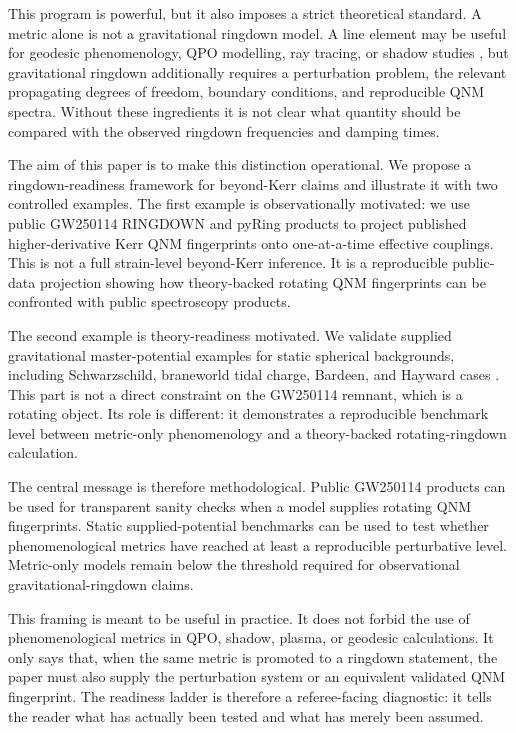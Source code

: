 \documentclass[aps,prd,10pt,twocolumn,nofootinbib,superscriptaddress]{revtex4-2}
\begin{document}
This program is powerful, but it also imposes a strict theoretical standard.
A metric alone is not a gravitational ringdown model. A line element may be
useful for geodesic phenomenology, QPO modelling, ray tracing, or shadow
studies \cite{Joh:2013:PRD:,Kon-Rez-Zhi:2016:PRD:,Ped-Vag:2024:PRD:},
but gravitational ringdown additionally requires a perturbation problem, the
relevant propagating degrees of freedom, boundary conditions, and reproducible
QNM spectra. Without these ingredients it is not clear what quantity should be
compared with the observed ringdown frequencies and damping times.

The aim of this paper is to make this distinction operational. We propose a
ringdown-readiness framework for beyond-Kerr claims and illustrate it with two
controlled examples. The first example is observationally motivated: we use
public GW250114 RINGDOWN and pyRing products
\cite{LIG-Vir-KAG:2025:ARXIV:,LIG-Vir-KAG:2025:ZENODO:} to project published
higher-derivative Kerr QNM fingerprints \cite{Can-Cap-Fra:2024:ARXIV:,Can-Fra-Her:2023:ARXIV:,Can-etal:2024:GITHUB:}
onto one-at-a-time effective couplings. This is not a full strain-level
beyond-Kerr inference. It is a reproducible public-data projection showing how
theory-backed rotating QNM fingerprints can be confronted with public
spectroscopy products.

The second example is theory-readiness motivated. We validate supplied
gravitational master-potential examples for static spherical backgrounds,
including Schwarzschild, braneworld tidal charge, Bardeen, and Hayward cases
\cite{Ber-Car-Sta:2009:CQG:,Tos-Stu-Sch:2016:PRD:,Ulh:2014:BJP:,Bol-Skv:2025:ARXIV:}.
This part is not a direct constraint on the GW250114 remnant, which is a
rotating object. Its role is different: it demonstrates a reproducible
benchmark level between metric-only phenomenology and a theory-backed
rotating-ringdown calculation.

The central message is therefore methodological. Public GW250114 products can
be used for transparent sanity checks when a model supplies rotating QNM
fingerprints. Static supplied-potential benchmarks can be used to test whether
phenomenological metrics have reached at least a reproducible perturbative
level. Metric-only models remain below the threshold required for
observational gravitational-ringdown claims.

This framing is meant to be useful in practice. It does not forbid the use of
phenomenological metrics in QPO, shadow, plasma, or geodesic calculations. It
only says that, when the same metric is promoted to a ringdown statement, the
paper must also supply the perturbation system or an equivalent validated QNM
fingerprint. The readiness ladder is therefore a referee-facing diagnostic:
it tells the reader what has actually been tested and what has merely been
assumed.
\end{document}
